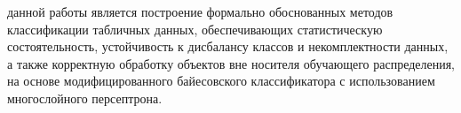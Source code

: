 


{\aim} данной работы является построение формально обоснованных методов классификации табличных данных, обеспечивающих статистическую состоятельность, устойчивость к дисбалансу классов и некомплектности данных, а также корректную обработку объектов вне носителя обучающего распределения, на основе модифицированного байесовского классификатора с использованием многослойного персептрона.

